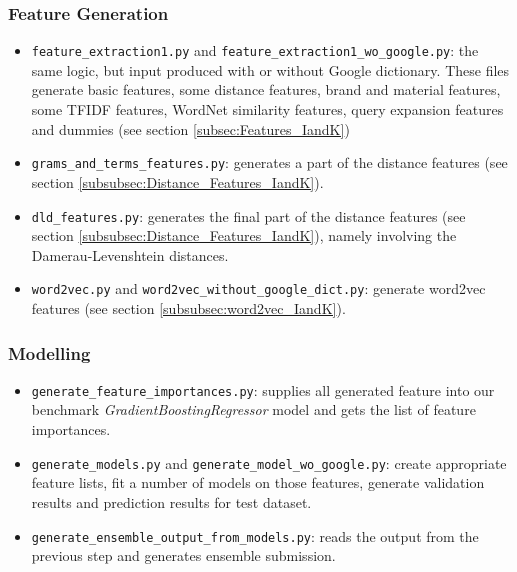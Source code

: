 \documentclass[12pt]{article}
\begin{document}
\subsubsection{Feature Generation}
\begin{itemize}
\item \texttt{feature\_extraction1.py} and \texttt{feature\_extraction1\_wo\_google.py}: the same logic, but input produced with or without Google dictionary. These files generate basic features, some distance features, brand and material features, some TFIDF features, WordNet similarity features, query expansion features and dummies (see section \ref{subsec:Features_IandK})
\item \texttt{grams\_and\_terms\_features.py}: generates a part of the distance features (see section \ref{subsubsec:Distance_Features_IandK}).
\item \texttt{dld\_features.py}: generates the final part of the distance features  (see section \ref{subsubsec:Distance_Features_IandK}), namely involving the Damerau-Levenshtein distances.
\item \texttt{word2vec.py} and \texttt{word2vec\_without\_google\_dict.py}: generate word2vec features  (see section \ref{subsubsec:word2vec_IandK}).
\end{itemize}

\subsubsection{Modelling}
\begin{itemize}
\item \texttt{generate\_feature\_importances.py}: supplies all generated feature into our benchmark \emph{GradientBoostingRegressor} model and gets the list of feature importances.
\item \texttt{generate\_models.py} and \texttt{generate\_model\_wo\_google.py}: create appropriate feature lists, fit a number of models on those features, generate validation results and prediction results for test dataset.
\item \texttt{generate\_ensemble\_output\_from\_models.py}: reads the output from the previous step and generates ensemble submission.
\end{itemize}
\end{document}
